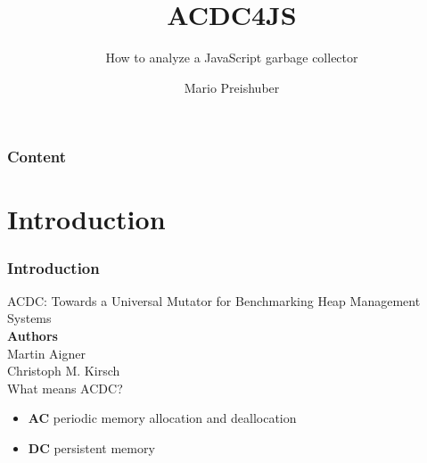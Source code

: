 \documentclass[xcolor=x11names,compress]{beamer}
\title{ACDC4JS}
\subtitle{How to analyze a JavaScript garbage collector}
\author{Mario Preishuber}
\institute[2013]{University of Salzburg}
\begin{document}
	
	\begin{frame}
		\titlepage
	\end{frame}

	\begin{frame}
		\frametitle{Content}
		\setcounter{tocdepth}{1}
		\tableofcontents
	\end{frame}
	
	
	\section{Introduction}	
	\begin{frame}
		\frametitle{Introduction}
		ACDC: Towards a Universal Mutator for
		Benchmarking Heap Management Systems \\
		\bigskip
		\textbf{Authors} \\
		Martin Aigner \\ 
		Christoph M. Kirsch \\
		\bigskip
		What means ACDC?
		\begin{itemize}
			\item \textbf{AC} periodic memory allocation and deallocation
			\item \textbf{DC} persistent memory
		\end{itemize}	
		
	\end{frame}
	
\end{document}

